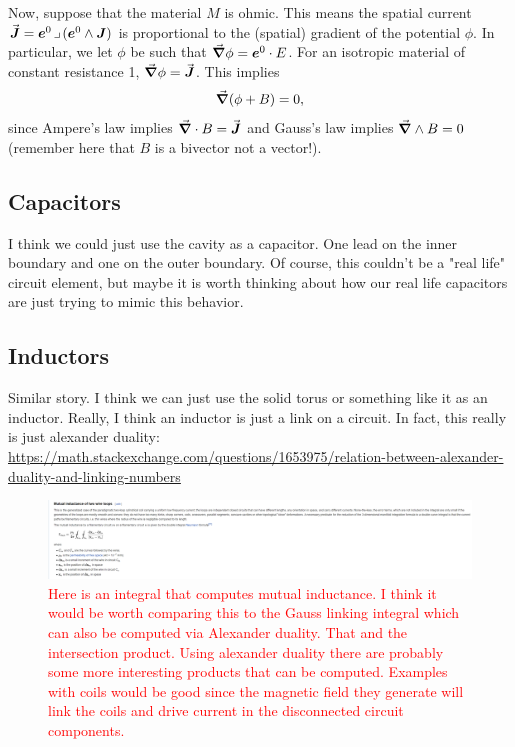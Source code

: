 \documentclass{article}
\begin{document}
Now, suppose that the material $M$ is ohmic. This means the spatial current $\vec{\boldsymbol{J}}=\boldsymbol{e}^0\hspace*{.5mm}\lrcorner \hspace*{.5mm} (\boldsymbol{e}^0 \wedge \boldsymbol{J})$ is proportional to the (spatial) gradient of the potential $\phi$. In particular, we let $\phi$ be such that $\vec{\boldsymbol{\nabla}}\phi = \boldsymbol{e}^0 \cdot E$. For an isotropic material of constant resistance 1, $\vec{\boldsymbol{\nabla}} \phi = \vec{\boldsymbol{J}}$. This implies
\begin{equation}
    \vec{\boldsymbol{\nabla}} (\phi + B) = 0,
\end{equation}
since Ampere's law implies $\vec{\boldsymbol{\nabla}} \cdot B = \vec{\boldsymbol{J}}$ and Gauss's law implies $\vec{\boldsymbol{\nabla}} \wedge B = 0$ (remember here that $B$ is a bivector not a vector!).

\subsection{Capacitors}
I think we could just use the cavity as a capacitor.
One lead on the inner boundary and one on the outer boundary. 
Of course, this couldn't be a "real life" circuit element, but maybe it is worth thinking about how our real life capacitors are just trying to mimic this behavior.

\subsection{Inductors}
Similar story. 
I think we can just use the solid torus or something like it as an inductor. 
Really, I think an inductor is just a link on a circuit. 
In fact, this really is just alexander duality: \url{https://math.stackexchange.com/questions/1653975/relation-between-alexander-duality-and-linking-numbers}

\begin{figure}[H]
    \centering
    \includegraphics[width=\textwidth]{figures/mutual_inductance.png}
    \caption{\textcolor{red}{Here is an integral that computes mutual inductance. I think it would be worth comparing this to the Gauss linking integral which can also be computed via Alexander duality. That and the intersection product. Using alexander duality there are probably some more interesting products that can be computed. Examples with coils would be good since the magnetic field they generate will link the coils and drive current in the disconnected circuit components.}}
\end{figure}
\end{document}

